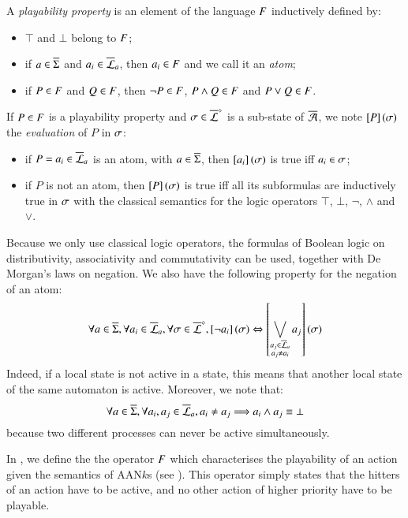 \begin{definition}
  \label{def:pp}
  A \emph{playability property} is an element of the language $F$ inductively defined by:
  \begin{itemize}
    \item $\top$ and $\bot$ belong to $F$;
    \item if $a \in \overline{\Sigma}$ and $a_i \in \overline{\mathcal{L}}_a$, then $a_i \in F$ and we call it an \emph{atom};
    \item if $P \in F$ and $Q \in F$, then $\neg P \in F$, $P \wedge Q \in F$ and $P \vee Q \in F$.
  \end{itemize}
  If $P \in F$ is a playability property and $\sigma \in \overline{\mathcal{L}}^{\diamond}$ is a sub-state of $\overline{\mathcal{A}}$,
  we note $\left[P\right](\sigma)$ the \emph{evaluation} of $P$ in $\sigma$:
  \begin{itemize}
    \item if $P = a_i \in \overline{\mathcal{L}}_a$ is an atom, with $a \in \overline{\Sigma}$, then $\left[a_i\right](\sigma)$ is true iff $a_i \in \sigma$;
    \item if $P$ is not an atom, then $\left[P\right](\sigma)$ is true iff all its subformulas are inductively true in $\sigma$
      with the classical semantics for the logic operators $\top$, $\bot$, $\neg$, $\wedge$ and $\vee$.
  \end{itemize}
\end{definition}

Because we only use classical logic operators, the formulas of Boolean logic on 
distributivity, associativity and commutativity can be used, together with De Morgan's laws on negation.
We also have the following property for the negation of an atom:
\[\forall a \in \overline{\Sigma}, \forall a_i \in \overline{\mathcal{L}}_a, \forall \sigma \in \overline{\mathcal{L}}^{\diamond},
  \left[\neg a_i\right](\sigma) \Leftrightarrow \left[\bigvee_{\substack{a_j \in \overline{\mathcal{L}}_a\\a_j \neq a_i}} a_j\right](\sigma)\]
Indeed, if a local state is not active in a state, this means that another local state of the same automaton is active.
Moreover, we note that:
\[\forall a \in \overline{\Sigma}, \forall a_i, a_j \in \overline{\mathcal{L}}_a,
  a_i \neq a_j \Longrightarrow a_i \wedge a_j \equiv \bot \]
because two different processes can never be active simultaneously.

In , we define the the operator $F$ which characterises the playability of an action
given the semantics of AAN$k$s (see ).
This operator simply states that the hitters of an action have to be active,
and no other action of higher priority have to be playable.


